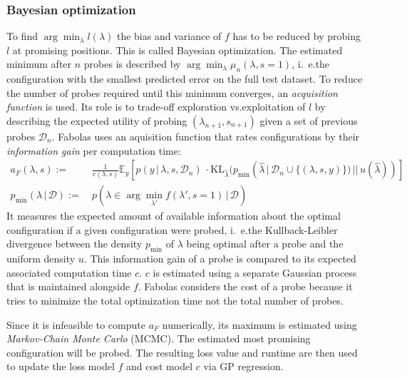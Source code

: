 \subsubsection{Bayesian optimization}%
\label{sec:hyperparams:fabolas:bayesian}

To find \(\arg\min_\lambda l(\lambda)\) the bias and variance of \(f\) has to be reduced by probing \(l\) at promising positions.
This is called Bayesian optimization.
The estimated minimum after \(n\) probes is described by \(\arg\min_\lambda \mu_n(\lambda, s = 1)\), i.~e.\@ the configuration with the smallest predicted error on the full test dataset.
To reduce the number of probes required until this minimum converges, an \textit{acquisition function} is used.
Its role is to trade-off exploration vs.\@ exploitation of \(l\) by describing the expected utility of probing \((\lambda_{n+1}, s_{n+1})\) given a set of previous probes \(\mathcal{D}_n\).
Fabolas uses an aquisition function that rates configurations by their \textit{information gain} per computation time:
\begin{align}
	a_F(\lambda, s) :=&\ \frac{1}{c(\lambda, s)} \mathbb{E}_y\left[ p(y\, |\, \lambda, s, \mathcal{D}_n)\ \cdot \mathrm{KL}_{\hat{\lambda}}(p_{\min}(\hat{\lambda}\, |\, \mathcal{D}_n \cup \{(\lambda, s, y)\})\, ||\, u(\hat{\lambda}))\right] \\
	p_{\min}(\lambda\, |\, \mathcal{D}) :=&\ p(\lambda \in \arg\min_{\lambda'}{f(\lambda', s = 1)}\, |\, \mathcal{D}) \nonumber
\end{align}
It measures the expected amount of available information about the optimal configuration if a given configuration were probed, i.~e.\@ the Kullback-Leibler divergence between the density \(p_\min\) of \(\lambda\) being optimal after a probe and the uniform density \(u\).
This information gain of a probe is compared to its expected associated computation time \(c\).
\(c\) is estimated using a separate Gaussian process that is maintained alongside \(f\).
Fabolas considers the cost of a probe because it tries to minimize the total optimization time not the total number of probes.

Since it is infeasible to compute \(a_F\) numerically, its maximum is estimated using \textit{Markov-Chain Monte Carlo} (MCMC).
The estimated most promising configuration will be probed.
The resulting loss value and runtime are then used to update the loss model \(f\) and cost model \(c\) via GP regression.


